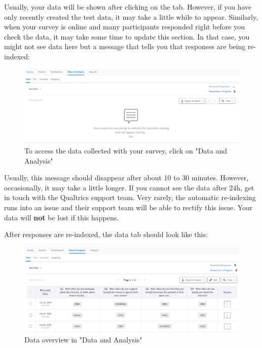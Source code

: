 \documentclass[
]{book}
\begin{document}
Usually, your data will be shown after clicking on the tab. However, if you have only recently created the test data, it may take a little while to appear. Similarly, when your survey is online and many participants responded right before you check the data, it may take some time to update this section. In that case, you might not see data here but a message that tells you that responses are being re-indexed:

\begin{figure}

{\centering \includegraphics[width=0.85\linewidth]{images/Qualtrics/13checkdata2} 

}

\caption{To access the data collected with your survey, click on "Data and Analysis"}\label{fig:Figure11-12}
\end{figure}

Usually, this message should disappear after about 10 to 30 minutes. However, occasionally, it may take a little longer. If you cannot see the data after 24h, get in touch with the Qualtrics support team. Very rarely, the automatic re-indexing runs into an issue and their support team will be able to rectify this issue. Your data will \textbf{not} be lost if this happens.

After responses are re-indexed, the data tab should look like this:

\begin{figure}

{\centering \includegraphics[width=0.99\linewidth]{images/Qualtrics/13checkdata3} 

}

\caption{Data overview in "Data and Analysis"}\label{fig:Figure11-13}
\end{figure}
\end{document}
